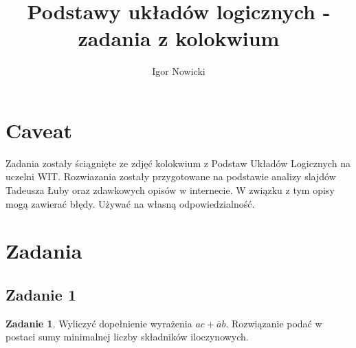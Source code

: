 \documentclass[11pt]{article}
\title{Podstawy układów logicznych - zadania z kolokwium}
\author{Igor Nowicki}
\theoremstyle{definition}
\newtheorem{zadanie}{Zadanie}
\begin{document}
\maketitle
\section{Caveat}

Zadania zostały ściągnięte ze zdjęć kolokwium z Podstaw Układów Logicznych na uczelni WIT. Rozwiazania zostały przygotowane na podstawie analizy slajdów Tadeusza Łuby oraz zdawkowych opisów w internecie. W związku z tym opisy mogą zawierać błędy. Używać na własną odpowiedzialność.

\section{Zadania}
\subsection{Zadanie 1}
\begin{zadanie}
Wyliczyć dopełnienie wyrażenia $ac+\overline a b$. Rozwiązanie podać w postaci sumy minimalnej liczby składników iloczynowych.
\end{zadanie}
\end{document}

